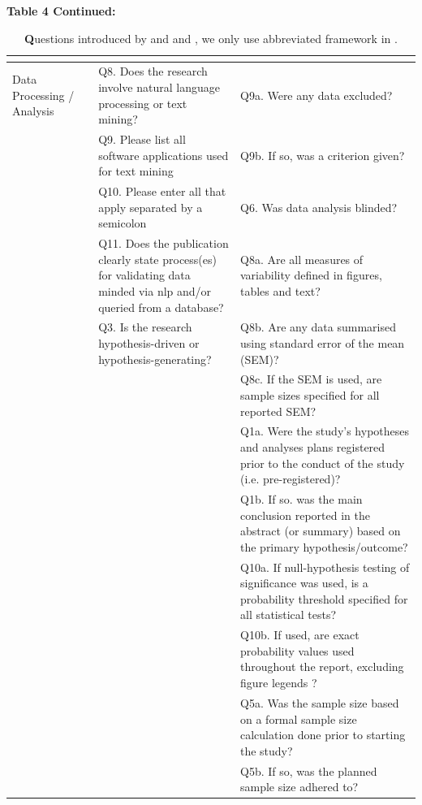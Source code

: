 \documentclass[12pt, a4paper, twocolumn]{article}
\begin{document}
	\begin{table}[]
	\centering
	\caption[]{\textbf Questions introduced by \citet{stagge2019assessing} and  \citet{mcintosh2017repeat} and \citet{QualityOutputChecklist}, we only use abbreviated framework in \citet{mcintosh2017repeat}. }\label{tab:survey_table_3}{\textbf{Table 4 Continued:}}
	\begin{tabular}{>{\raggedright\arraybackslash}p{}>{\raggedright\arraybackslash}p{} >{\raggedright\arraybackslash}p{}>{\raggedright\arraybackslash}p{}}  
	\hline
&	\citet{stagge2019assessing}                                                                           & \citet{mcintosh2017repeat}        					 &\citet{QualityOutputChecklist}                   \\ 
\hline
Data Processing / Analysis
&&Q8. Does the research involve natural language processing or text mining?   &Q9a. Were any data excluded? 		\\
&&Q9. Please list all software applications used for text mining  &Q9b. If so, was a criterion given? \\
&&Q10. Please enter all that apply separated by a semicolon&Q6. Was data analysis blinded?\\
&&Q11. Does the publication clearly state process(es) for validating data minded via nlp and/or queried from a database?      &Q8a. Are all measures of variability defined in figures, tables and text?		 \\
&&Q3. Is the research hypothesis-driven or hypothesis-generating?           &Q8b. Are any data summarised using standard error of the mean (SEM)? 		\\
&&&Q8c. If the SEM is used, are sample sizes specified for all reported SEM?            \\
&&&Q1a. Were the study's hypotheses and analyses plans registered prior to the conduct of the study (i.e. pre-registered)?   \\
&&&Q1b. If so. was the main conclusion reported in the abstract (or summary) based on the primary hypothesis/outcome?     \\
&&&Q10a. If null-hypothesis testing of significance was used, is a probability threshold specified for all statistical tests?	\\
&&&Q10b. If used, are exact probability values used throughout the report, excluding figure legends ? \\
&&&Q5a. Was the sample size based on a formal sample size calculation done prior to starting the study? 	                      \\
&&&Q5b. If so, was the planned sample size adhered to?    \\	 
\hline
	\end{tabular}
	\end{table}
\end{document}

